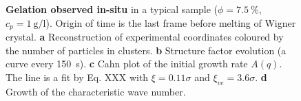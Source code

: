 \begin{figure}
\caption{\textbf{Gelation observed in-situ} in a typical sample ($\phi=7.5~\%$, $c_p=\SI{1}{\gram\per\litre}$). Origin of time is the last frame before melting of Wigner crystal. \textbf{a} Reconstruction of experimental coordinates coloured by the number of particles in clusters. \textbf{b} Structure factor evolution (a curve every \SI{150}{\second}). \textbf{c} Cahn plot of the initial growth rate $A(q)$. The line is a fit by Eq. XXX with $\xi=0.11\sigma$ and $\xi_{ve}=3.6\sigma$. \textbf{d} Growth of the characteristic wave number.}
\label{fig:wholeprocess}
\end{figure}



